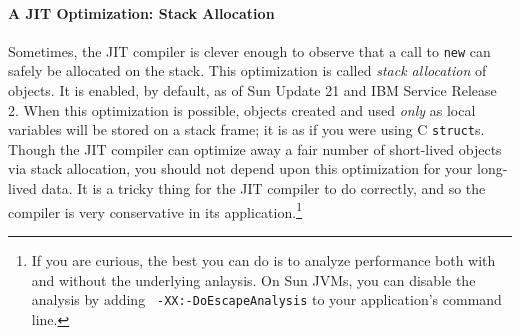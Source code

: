 \paragraph{A JIT Optimization: Stack Allocation}
Sometimes, the JIT compiler is clever enough to observe that a call to {\tt new}
can safely be allocated on the stack. This optimization is called \emph{stack
allocation} of objects. It is enabled, by default, as of
Sun \javasix Update 21 and IBM \javasix Service Release 2. When this
optimization is possible, objects created and used \emph{only} as local variables will be stored
on a stack frame; it is as if you were using C {\tt struct}s.
Though the JIT compiler can optimize away a fair number of short-lived objects
via stack allocation, you should not depend upon this optimization for your
long-lived data. It is a tricky thing for the JIT compiler to do correctly, and
so the compiler is very conservative in its application.\footnote{If you are
curious, the best you can do is to analyze performance both with and without the
underlying anlaysis. On Sun JVMs, you can disable the analysis by adding {\tt
-XX:-DoEscapeAnalysis} to your application's command line.}




